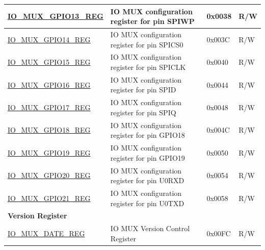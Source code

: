 \begin{longtable}{ | p{6cm} | p{7.2cm} | p{1.3cm} | p{1cm} | }
\hyperref[regdesc:IOMUXGPIONREG]{IO\_MUX\_GPIO13\_REG} & IO MUX configuration register for pin SPIWP & 0x0038 & R/W \\ \hline
\hyperref[regdesc:IOMUXGPIONREG]{IO\_MUX\_GPIO14\_REG} & IO MUX configuration register for pin SPICS0 & 0x003C & R/W \\ \hline
\hyperref[regdesc:IOMUXGPIONREG]{IO\_MUX\_GPIO15\_REG} & IO MUX configuration register for pin SPICLK & 0x0040 & R/W \\ \hline
\hyperref[regdesc:IOMUXGPIONREG]{IO\_MUX\_GPIO16\_REG} & IO MUX configuration register for pin SPID & 0x0044 & R/W \\ \hline
\hyperref[regdesc:IOMUXGPIONREG]{IO\_MUX\_GPIO17\_REG} & IO MUX configuration register for pin SPIQ & 0x0048 & R/W \\ \hline
\hyperref[regdesc:IOMUXGPIONREG]{IO\_MUX\_GPIO18\_REG} & IO MUX configuration register for pin GPIO18 & 0x004C & R/W \\ \hline
\hyperref[regdesc:IOMUXGPIONREG]{IO\_MUX\_GPIO19\_REG} & IO MUX configuration register for pin GPIO19 & 0x0050 & R/W \\ \hline
\hyperref[regdesc:IOMUXGPIONREG]{IO\_MUX\_GPIO20\_REG} & IO MUX configuration register for pin U0RXD & 0x0054 & R/W \\ \hline
\hyperref[regdesc:IOMUXGPIONREG]{IO\_MUX\_GPIO21\_REG} & IO MUX configuration register for pin U0TXD & 0x0058 & R/W \\ \hline
\multicolumn{4}{|l|}{\textbf{Version Register}} \\ \hline
\hyperref[regdesc:IOMUXDATEREG]{IO\_MUX\_DATE\_REG} & IO MUX Version Control Register & 0x00FC & R/W \\ \hline
\end{longtable}
